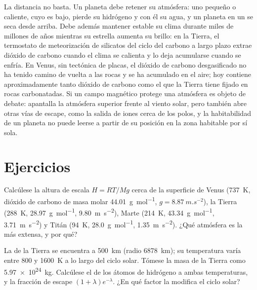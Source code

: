 La distancia no basta. Un planeta debe retener su atmósfera: uno pequeño
o caliente, cuyo  es bajo, pierde su hidrógeno y con él
su agua, y un planeta en un  se seca desde arriba. Debe
además mantener estable su clima durante miles de millones de años mientras su estrella
aumenta su brillo: en la Tierra, el termostato de meteorización de silicatos del
ciclo del carbono a largo plazo extrae dióxido de carbono cuando el clima se calienta
y lo deja acumularse cuando se enfría. En Venus, sin tectónica de placas,
el dióxido de carbono desgasificado no ha tenido camino de vuelta a las rocas y se ha
acumulado en el aire; hoy contiene aproximadamente tanto dióxido de carbono como el que
la Tierra tiene fijado en rocas carbonatadas. Si un campo magnético protege una
atmósfera es objeto de debate: apantalla la atmósfera superior frente al
viento solar, pero también abre otras vías de escape, como la salida de iones
cerca de los polos, y la habitabilidad de un planeta no puede leerse a partir de su
posición en la zona habitable por sí sola.

\section{Ejercicios}

\begin{exercise}[$\star$]\label{exo:b3:planetary-atmospheres:1}
Calcúlese la altura de escala $H = RT/Mg$ cerca de la superficie de Venus
(\qty{737}{K}, dióxido de carbono de masa molar \qty{44.01}{g.mol^{-1}},
$g = \qty{8.87}{m.s^{-2}}$), la Tierra (\qty{288}{K},
\qty{28.97}{g.mol^{-1}}, \qty{9.80}{m.s^{-2}}), Marte (\qty{214}{K},
\qty{43.34}{g.mol^{-1}}, \qty{3.71}{m.s^{-2}}) y Titán (\qty{94}{K},
\qty{28.0}{g.mol^{-1}}, \qty{1.35}{m.s^{-2}}). ¿Qué atmósfera es la
más extensa, y por qué?
\end{exercise}

\begin{exercise}[$\star$]\label{exo:b3:planetary-atmospheres:2}
La  de la Tierra se encuentra a \qty{500}{km} (radio \qty{6878}{km}); su
temperatura varía entre 800 y \qty{1600}{K} a lo largo del ciclo solar. Tómese
la masa de la Tierra como \qty{5.97e24}{kg}. Calcúlese el 
de los átomos de hidrógeno a ambas temperaturas, y la fracción de escape
$(1 + \lambda)e^{-\lambda}$. ¿En qué factor la modifica el ciclo solar?
\end{exercise}

